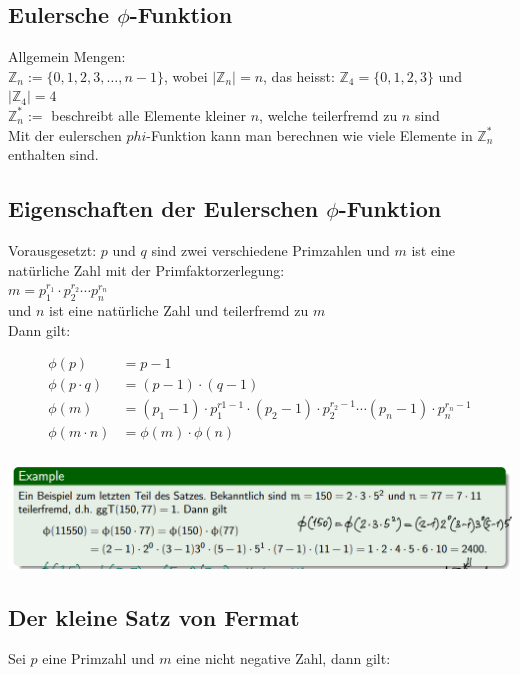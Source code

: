 \documentclass[12pt]{scrartcl}
\begin{document}
\newpage
\subsection{Eulersche $\phi$-Funktion}
Allgemein Mengen:\\
$\mathbb{Z}_n := \{0,1,2,3, \dots, n-1\}$, wobei $|\mathbb{Z}_n| = n$, das heisst: $\mathbb{Z}_4 = \{0, 1, 2, 3\}$ und $|\mathbb{Z}_4| = 4$\\
$\mathbb{Z}_n^* := $ beschreibt alle Elemente kleiner $n$, welche teilerfremd zu $n$ sind\\

Mit der eulerschen $phi$-Funktion kann man berechnen wie viele Elemente in $\mathbb{Z}_n^*$ enthalten sind.\\


\subsection{Eigenschaften der Eulerschen $\phi$-Funktion}
Vorausgesetzt: $p$ und $q$ sind zwei verschiedene Primzahlen und $m$ ist eine natürliche Zahl mit der Primfaktorzerlegung:\\

$m = p_1^{r_1} \cdot p_2^{r_2} \cdots p_n^{r_n}$\\

und $n$ ist eine natürliche Zahl und teilerfremd zu $m$\\

Dann gilt:

\begin{align*}
    \phi(p) &= p - 1 \\
    \phi(p \cdot q) &= (p - 1) \cdot (q - 1) \\
    \phi(m) &= (p_1 - 1) \cdot p_1^{r1-1} \cdot (p_2 - 1) \cdot p_2^{r_2 - 1} \cdots (p_n - 1) \cdot p_n^{r_n - 1} \\
    \phi(m \cdot n) &= \phi(m) \cdot \phi(n) \\
\end{align*}

\includegraphics[width=14cm]{img/example_euler_phi.png}

\newpage
\subsection{Der kleine Satz von Fermat}
Sei $p$ eine Primzahl und $m$ eine nicht negative Zahl, dann gilt:\\
\end{document}
